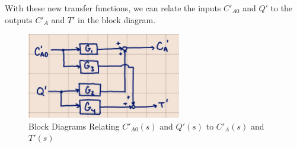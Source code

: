 \documentclass[12pt]{article}
\begin{document}
\begin{enumerate}
\begin{enumerate}
    With these new transfer functions, we can relate the inputs $C'_{A0}$ and $Q'$ to the outputs $C'_A$ and $T'$ in the block diagram.

    \begin{figure}[H]
      \centering
      \includegraphics[width=0.6\textwidth]{Figures/handcalc/figure4-4e.png}
      \caption{Block Diagrams Relating $C'_{A0}(s)$ and $Q'(s)$ to $C'_A(s)$ and $T'(s)$}
      \label{fig:figure49}
    \end{figure}


  \end{enumerate}

\end{enumerate}
\end{document}
